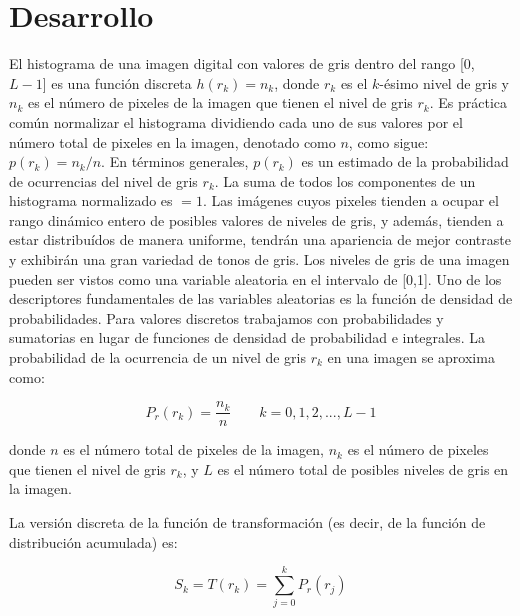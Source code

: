 \documentclass{article}
\begin{document}
\section{Desarrollo}\label{sec:desarr}
El histograma de una imagen digital con valores de gris dentro del rango [0, $L-1$] es una función discreta $h(r_{k})=n_{k}$, donde $r_{k}$ es el $k$-ésimo nivel de gris y $n_{k}$ es el número de pixeles de la imagen que tienen el nivel de gris $r_{k}$.
Es práctica común normalizar el histograma dividiendo cada uno de sus valores por el número total de pixeles en la imagen, denotado como $n$, como sigue: $p(r_{k})=n_{k}/n$.
En términos generales, $p(r_{k})$ es un estimado de la probabilidad de ocurrencias del nivel de gris $r_{k}$. La suma de todos los componentes de un histograma normalizado es $= 1$.
Las imágenes cuyos pixeles tienden a ocupar el rango dinámico entero de posibles valores de niveles de gris, y además, tienden a estar distribuídos de manera uniforme, tendrán una apariencia de mejor contraste y exhibirán una gran variedad de tonos de gris. 
Los niveles de gris de una imagen pueden ser vistos como una variable aleatoria en el intervalo de [0,1]. Uno de los descriptores fundamentales de las variables aleatorias es la función de densidad de probabilidades.
Para valores discretos trabajamos con probabilidades y sumatorias en lugar de funciones de densidad de probabilidad e integrales. La probabilidad de la ocurrencia de un nivel de gris $r_{k}$ en una imagen se aproxima como:


\begin{equation}
P_{r}(r_{k})=\frac{n_{k}}{n} \qquad k=0,1,2,...,L-1
\label{eq:1} 
\end{equation}

donde $n$ es el número total de pixeles de la imagen, $n_{k}$ es el número de pixeles que tienen el nivel de gris $r_{k}$, y $L$ es el número total de posibles niveles de gris en la imagen.

La versión discreta de la función de transformación (es decir, de la función de distribución acumulada) es:

\begin{equation}
S_{k}=T(r_{k})=\sum \limits_{j=0}^{k}P_{r}(r_{j})
\label{eq:1} 
\end{equation}
\end{document}
